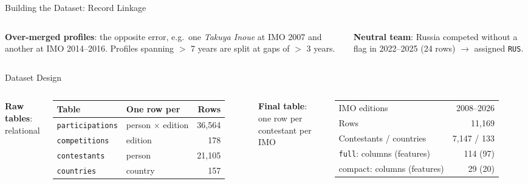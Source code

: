 \documentclass[aspectratio=169]{beamer}
\begin{document}
\begin{frame}{Building the Dataset: Record Linkage}
\begin{columns}[T]
      \vspace{6pt}
      \textbf{Over-merged profiles}: the opposite error, e.g.\ one
      \emph{Takuya Inoue} at IMO 2007 and another at IMO 2014--2016. Profiles
      spanning $>$ 7 years are split at gaps of $>$ 3 years.

      \vspace{6pt}
      \textbf{Neutral team}: Russia competed without a flag in 2022--2025
      (24 rows) $\rightarrow$ assigned \texttt{RUS}.
  \end{columns}
\end{frame}

\begin{frame}{Dataset Design}
  \begin{columns}[T]
      \footnotesize
      \textbf{Raw tables}: relational

      \vspace{2pt}
      \scriptsize
      \setlength{\tabcolsep}{3pt}
      \begin{tabular}{llr}
        \toprule
        \textbf{Table} & \textbf{One row per} & \textbf{Rows} \\
        \midrule
        \texttt{participations} & person $\times$ edition & 36,564 \\
        \texttt{competitions}   & edition & 178 \\
        \texttt{contestants}    & person  & 21,105 \\
        \texttt{countries}      & country & 157 \\
        \bottomrule
      \end{tabular}

      \vspace{8pt}
      \footnotesize
      \textbf{Final table}: one row per contestant per IMO

      \vspace{2pt}
      \scriptsize
      \begin{tabular}{lr}
        \toprule
        IMO editions & 2008--2026 \\
        Rows & 11,169 \\
        Contestants / countries & 7,147 / 133 \\
        \texttt{full}: columns (features) & 114 (97) \\
        compact: columns (features) & 29 (20) \\
        \bottomrule
      \end{tabular}


\end{columns}
\end{frame}
\end{document}
